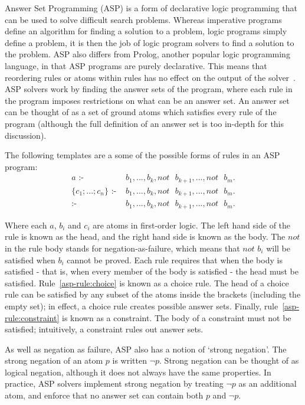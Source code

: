 \documentclass[../interim.tex]{subfiles}
\begin{document}
Answer Set Programming (ASP) is a form of declarative logic programming that can be used to solve difficult search problems. Whereas imperative programs define an algorithm for finding a solution to a problem, logic programs simply define a problem, it is then the job of logic program solvers to find a solution to the problem. ASP also differs from Prolog, another popular logic programming language, in that ASP programs are purely declarative. This means that reordering rules or atoms within rules has no effect on the output of the solver~\cite{asp-primer}. ASP solvers work by finding the answer sets of the program, where each rule in the program imposes restrictions on what can be an answer set. An answer set can be thought of as a set of ground atoms which satisfies every rule of the program (although the full definition of an answer set is too in-depth for this discussion).

The following templates are a some of the possible forms of rules in an ASP program:
\begin{align}
  a \text{ :- }& b_1, ..., b_k, not \text{ } b_{k+1}, ..., not \text{ } b_m. \label{asp-rule:normal}\\
  \{c_1;...;c_n\} \text{ :- }& b_1,...,b_k, not \text{ } b_{k+1}, ..., not \text{ } b_m. \label{asp-rule:choice}\\
  \text{:- }& b_1,...,b_k, not \text{ } b_{k+1}, ..., not \text{ } b_m. \label{asp-rule:constraint}
\end{align}

Where each $a$, $b_i$ and $c_i$ are atoms in first-order logic. The left hand side of the rule is known as the head, and the right hand side is known as the body. The $not$ in the rule body stands for negation-as-failure, which means that $not$ $b_i$ will be satisfied when $b_i$ cannot be proved. Each rule requires that when the body is satisfied - that is, when every member of the body is satisfied - the head must be satisfied. Rule~\ref{asp-rule:choice} is known as a choice rule. The head of a choice rule can be satisfied by any subset of the atoms inside the brackets (including the empty set); in effect, a choice rule creates possible answer sets. Finally, rule~\ref{asp-rule:constraint} is known as a constraint. The body of a constraint must not be satisfied; intuitively, a constraint rules out answer sets.

As well as negation as failure, ASP also has a notion of `strong negation'. The strong negation of an atom $p$ is written $\neg p$. Strong negation can be thought of as logical negation, although it does not always have the same properties. In practice, ASP solvers implement strong negation by treating $\neg p$ as an additional atom, and enforce that no answer set can contain both $p$ and $\neg p$.
\end{document}
